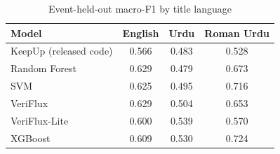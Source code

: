 \begin{table}[t]
\centering
\caption{Event-held-out macro-F1 by title language}
\label{tab:lang}
\footnotesize
\begin{tabular}{lccc}
\toprule
Model & English & Urdu & Roman Urdu\\
\midrule
KeepUp (released code) & 0.566 & 0.483 & 0.528\\
Random Forest & 0.629 & 0.479 & 0.673\\
SVM & 0.625 & 0.495 & 0.716\\
VeriFlux & 0.629 & 0.504 & 0.653\\
VeriFlux-Lite & 0.600 & 0.539 & 0.570\\
XGBoost & 0.609 & 0.530 & 0.724\\
\bottomrule
\end{tabular}
\end{table}
